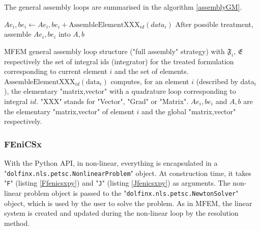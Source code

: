 \documentclass[12pt]{article}
\newcommand{\mycodepy}[1]{\textsf{"}\lstinline[language=Python]`#1`\textsf{"}}
\begin{document}
\bigskip
The general assembly loops are summarised in the algorithm \ref{assemblyGM}.
\begin{algorithm}[h]
	\footnotesize	
	\begin{algorithmic}
\State $Ae_{i},be_{i}\gets Ae_{i},be_{i} + \text{AssembleElementXXX}_{id}(data_i)$
\EndFor
\State After possible treatment, assemble $Ae_{i},be_{i}$ into $A,b$
\EndFor
	\end{algorithmic}
	\caption{MFEM general assembly loop structure ("full assembly" strategy) with $\mathfrak{F}_i$, $\mathfrak{E}$ respectively the set of integral ids (integrator) for the treated formulation corresponding to current element $i$ and the set of elements.  $\text{AssembleElementXXX}_{id}(\text{data}_i)$ computes, for an element $i$ (described by data$_i$), the elementary "matrix,vector" with a quadrature loop corresponding to integral $id$. "XXX" stands for "Vector", "Grad" or "Matrix". $Ae_i,be_i$ and $A,b$ are the elementary "matrix,vector" of element $i$ and the global "matrix,vector" respectively.\label{assemblyGM}}
\end{algorithm}

\subsubsection{FEniCSx}
With the Python API, in non-linear, everything is encapsulated in a \mycodepy{dolfinx.nls.petsc.NonlinearProblem} object.
At construction time, it takes \mycodepy{F} (listing \ref{Ffenicsxpy}) and \mycodepy{J} (listing \ref{Jfenicsxpy}) as arguments.
The non-linear problem object is passed to the \mycodepy{dolfinx.nls.petsc.NewtonSolver} object, which is used by the user to solve the problem.		
As in MFEM, the linear system is created and updated during the non-linear loop by the resolution method.
\end{document}
